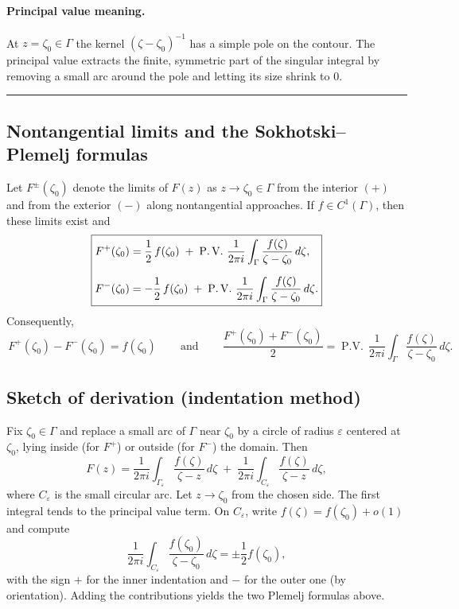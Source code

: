 \documentclass[11pt]{article}
\begin{document}
\paragraph{Principal value meaning.}
At $z=\zeta_0\in\Gamma$ the kernel $(\zeta-\zeta_0)^{-1}$ has a simple pole on the contour.
The principal value extracts the finite, symmetric part of the singular integral by removing a small arc around the pole and letting its size shrink to $0$.

\bigskip\hrule\bigskip

\subsection*{Nontangential limits and the Sokhotski--Plemelj formulas}

Let $F^\pm(\zeta_0)$ denote the limits of $F(z)$ as $z\to\zeta_0\in\Gamma$
from the interior $(+)$ and from the exterior $(-)$ along nontangential approaches.
If $f\in C^1(\Gamma)$, then these limits exist and
\[
\boxed{%
\begin{aligned}
F^{+}(\zeta_0) &= \frac{1}{2}\,f(\zeta_0)
\;+\;\operatorname{P.V.}\,\frac{1}{2\pi i}\int_{\Gamma}\frac{f(\zeta)}{\zeta-\zeta_0}\,d\zeta,\\[6pt]
F^{-}(\zeta_0) &= -\frac{1}{2}\,f(\zeta_0)
\;+\;\operatorname{P.V.}\,\frac{1}{2\pi i}\int_{\Gamma}\frac{f(\zeta)}{\zeta-\zeta_0}\,d\zeta.
\end{aligned}}
\]
Consequently,
\[
\boxed{\,F^{+}(\zeta_0)-F^{-}(\zeta_0)=f(\zeta_0)\,}
\qquad\text{and}\qquad
\boxed{\,\frac{F^{+}(\zeta_0)+F^{-}(\zeta_0)}{2}
=\operatorname{P.V.}\,\frac{1}{2\pi i}\int_{\Gamma}\frac{f(\zeta)}{\zeta-\zeta_0}\,d\zeta.}
\]

\bigskip

\subsection*{Sketch of derivation (indentation method)}

Fix $\zeta_0\in\Gamma$ and replace a small arc of $\Gamma$ near $\zeta_0$ by a circle of radius $\varepsilon$ centered at $\zeta_0$, lying inside (for $F^+$) or outside (for $F^-$) the domain. Then
\[
F(z)=\frac{1}{2\pi i}\!\!\int_{\Gamma_\varepsilon}\!\!\frac{f(\zeta)}{\zeta-z}\,d\zeta
\;+\;\frac{1}{2\pi i}\!\!\int_{C_\varepsilon}\!\!\frac{f(\zeta)}{\zeta-z}\,d\zeta,
\]
where $C_\varepsilon$ is the small circular arc. Let $z\to\zeta_0$ from the chosen side.
The first integral tends to the principal value term.
On $C_\varepsilon$, write $f(\zeta)=f(\zeta_0)+o(1)$ and compute
\[
\frac{1}{2\pi i}\int_{C_\varepsilon}\frac{f(\zeta_0)}{\zeta-\zeta_0}\,d\zeta
=\pm\frac{1}{2}f(\zeta_0),
\]
with the sign $+$ for the inner indentation and $-$ for the outer one (by orientation).
Adding the contributions yields the two Plemelj formulas above.
\end{document}
